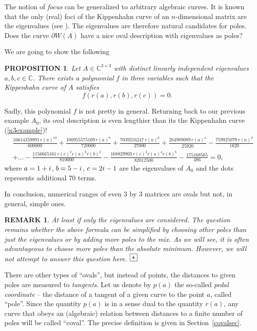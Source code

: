 \documentclass[10pt,a4paper,reqno]{amsart}
\newtheorem{rem}[defi]{\bf R\scriptsize EMARK \normalsize}
\newtheorem{prop}[defi]{\bf P\scriptsize ROPOSITION \normalsize}
\def\kopr{\hfill\raisebox{3pt}{\framebox{$\star$}}}
\newenvironment{remark}{\begin{rem}\rm}{$\kopr$\end{rem}}
\newenvironment{proposition}{\begin{prop}\it}{\end{prop}}
\newcommand{\imag}{{\rm i}}
\begin{document}
The notion of \textit{focus} can be generalized to arbitrary algebraic curves. It is known that the only (real) foci of the Kippenhahn curve of an $n$-dimensional matrix are the eigenvalues (see \cite[6.1]{WuGau}). The eigenvalues are therefore natural candidates for poles. Does the curve $\partial W(A)$ have a nice oval description with eigenvalues as poles?

We are going to show the following 
\begin{proposition}\label{P2}
Let $A\in\mathbb{C}^{3\times 3}$ with distinct linearly independent eigenvalues $a,b,c\in\mathbb{C}$. There exists a polynomial $f$ in three variables such that the Kippenhahn curve of $A$ satisfies
\begin{equation}
f(r(a),r(b),r(c))=0.
\end{equation}
\end{proposition}
Sadly, this polynomial $f$ is not pretty in general.
Returning back to our previous example $A_0$, its oval description is even lengthier than its the Kippenhahn curve (\ref{n3example})!
\begin{align}
\nonumber &{\frac {16614359891\, {r(a)} ^{10}}{600000
}}+{\frac {100955575169\, {r(a)} ^{8}}{
720000}}+{\frac {7039216247\, {r(a)} ^{6}
}{27000}}+{\frac {264989089\, {r(a)} ^{4}
}{25920}}-{\frac {759925079\, {r(a)} ^{2}
}{1620}}\\
\label{n3oval}&+\dots-{\frac {1156665161\, {r(c)} ^{2
} {r(a)} ^{6} r \left( b \right)^{2}}{810000}}-{\frac {168829903\, r \left( c \right)^{2} {r(a)} ^{4} r \left( 
b \right)^{6}}{82012500}}-{\frac {175168565}{486}}=0,
\end{align}
where $a=1+\imag$, $b=5-\imag$, $c=2\imag-1$ are the eigenvalues of $A_0$ 
and the dots represents additional 70 terms.

In conclusion, numerical ranges of even 3 by 3 matrices are ovals but not, in general, simple ones.
\begin{remark}
At least if only the eigenvalues are considered. The question remains whether the above formula can be simplified by choosing other poles than just the eigenvalues or by adding more poles to the mix. As we will see, it is often advantageous to choose more poles than the absolute minimum. However, we will not attempt to answer this question here. 
\end{remark}

There are other types of ``ovals'', but instead of points, the distances to given poles are measured to \textit{tangents}. Let us denote by $p(a)$ the so-called \textit{pedal coordinate} -- the distance of a tangent of a given curve to the point $a$, called ``pole''. Since the quantity $p(a)$ is in a sense dual to the quantity $r(a)$, any curve that obeys an (algebraic) relation between distances to a finite number of poles will be called ``coval''. The precise definition is given in Section~\ref{covalsec}.
\end{document}
